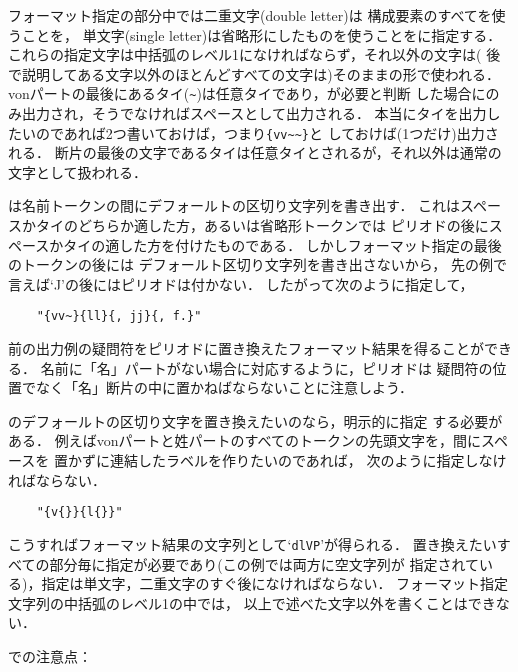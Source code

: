 フォーマット指定の部分中では二重文字(double letter)は
構成要素のすべてを使うことを，
単文字(single letter)は省略形にしたものを使うことを\BibTeX に指定する．
これらの指定文字は中括弧のレベル1になければならず，それ以外の文字は(
後で説明してある文字以外のほとんどすべての文字は)そのままの形で使われる．
vonパートの最後にあるタイ(\verb|~|)は任意タイであり，\BibTeX が必要と判断
した場合にのみ出力され，そうでなければスペースとして出力される．
本当にタイを出力したいのであれば2つ書いておけば，つまり{\verb|{vv~~}|}と
しておけば(1つだけ)出力される．
断片の最後の文字であるタイは任意タイとされるが，それ以外は通常の
文字として扱われる．

\BibTeX は名前トークンの{\dg 間に}デフォールトの区切り文字列を書き出す．
これはスペースかタイのどちらか適した方，あるいは省略形トークンでは
ピリオドの後にスペースかタイの適した方を付けたものである．
しかしフォーマット指定の最後のトークンの後には
デフォールト区切り文字列を書き出さないから，
先の例で言えば`J'の後にはピリオドは付かない．
したがって次のように指定して，
\begin{verbatim}
    "{vv~}{ll}{, jj}{, f.}"
\end{verbatim}
前の出力例の疑問符をピリオドに置き換えたフォーマット結果を得ることができる．
名前に「名」パートがない場合に対応するように，ピリオドは
疑問符の位置でなく「名」断片の中に置かねばならないことに注意しよう．

\BibTeX のデフォールトの区切り文字を置き換えたいのなら，明示的に指定
する必要がある．
例えばvonパートと姓パートのすべてのトークンの先頭文字を，間にスペースを
置かずに連結したラベルを作りたいのであれば，
次のように指定しなければならない．
\begin{verbatim}
    "{v{}}{l{}}"
\end{verbatim}
こうすればフォーマット結果の文字列として`{\tt dlVP}'が得られる．
置き換えたいすべての部分毎に指定が必要であり(この例では両方に空文字列が
指定されている)，指定は単文字，二重文字のすぐ後になければならない．
フォーマット指定文字列の中括弧のレベル1の中では，
以上で述べた文字以外を書くことはできない．

{\dg\noindent\JBibTeX での注意点}：

